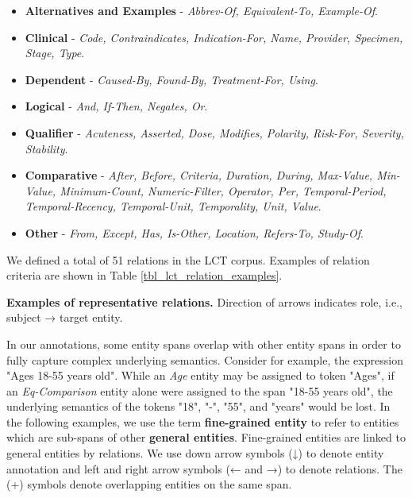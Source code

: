 \documentclass[../main.tex]{subfiles}
\begin{document}
\begin{itemize}
    \item \textbf{Alternatives and Examples} - \textit{Abbrev-Of, Equivalent-To, Example-Of}. %
    \item \textbf{Clinical} - \textit{Code, Contraindicates, Indication-For, Name, Provider, Specimen, Stage, Type}. %
    \item \textbf{Dependent} - \textit{Caused-By, Found-By, Treatment-For, Using}. %
    \item \textbf{Logical} - \textit{And, If-Then, Negates, Or}. %
    \item \textbf{Qualifier} - \textit{Acuteness, Asserted, Dose, Modifies, Polarity, Risk-For, Severity, Stability}.
    \item \textbf{Comparative} - \textit{After, Before, Criteria, Duration, During, Max-Value, Min-Value, Minimum-Count, Numeric-Filter, Operator, Per, Temporal-Period, Temporal-Recency, Temporal-Unit, Temporality, Unit, Value}.
    \item \textbf{Other} - \textit{From, Except, Has, Is-Other, Location, Refers-To, Study-Of}.
\end{itemize}

\noindent We defined a total of 51 relations in the LCT corpus. Examples of relation criteria are shown in Table \ref{tbl_lct_relation_examples}.

\begin{table}
    \centering
    \footnotesize
    
    \caption{\textbf{Examples of representative relations.} Direction of arrows indicates role, i.e., subject → target entity.}
    \label{tbl_lct_relation_examples}
\end{table}

In our annotations, some entity spans overlap with other entity spans in order to fully capture complex underlying semantics. Consider for example, the expression "Ages 18-55 years old". While an \textit{Age} entity may be assigned to token "Ages", if an \textit{Eq-Comparison} entity alone were assigned to the span "18-55 years old", the underlying semantics of the tokens "18", "-", "55", and "years" would be lost. In the following examples, we use the term \textbf{fine-grained entity} to refer to entities which are sub-spans of other \textbf{general entities}. Fine-grained entities are linked to general entities by relations. We use down arrow symbols (↓) to denote entity annotation and left and right arrow symbols (← and →) to denote relations. The (+) symbols denote overlapping entities on the same span.
\end{document}
